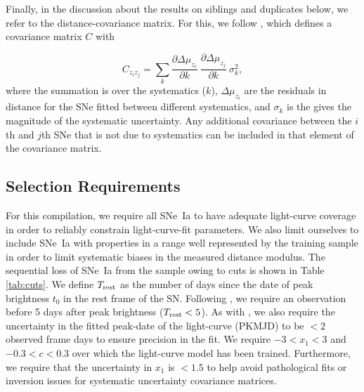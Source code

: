 \documentclass[twocolumn]{aastex63}
\newcommand{\zindex}{z}
\begin{document}
Finally, in the discussion about the results on siblings and duplicates below, we refer to the distance-covariance matrix.  For this, we follow \cite{Conley2010}, which defines a covariance matrix $C$ with

\begin{equation}
C_{z_iz_j} = \sum_{k} \frac{\partial \Delta\mu_{{\zindex}_i}}{\partial k} ~ \frac{\partial \Delta\mu_{{\zindex}_j}}{\partial k} ~ \sigma_k^2,
\label{eq:cov}
\end{equation}
where the summation is over the systematics ($k$), $\Delta\mu_{{\zindex}_i}$ are the residuals in distance for the SNe fitted between different systematics, and $\sigma_k$ is the gives the magnitude of the systematic uncertainty. Any additional covariance between the $i$th and $j$th SNe that is not due to systematics can be included in that element of the covariance matrix.


\subsection{Selection Requirements}
\label{sec:selection}




For this compilation, we require all SNe~Ia to have adequate light-curve coverage in order to reliably constrain light-curve-fit parameters.  We also limit ourselves to include SNe~Ia with properties in a range well represented by the training sample in order to limit systematic biases in the measured distance modulus. The sequential loss of SNe~Ia from the sample owing to cuts is shown in Table \ref{tab:cuts}.  We define $T_{\rm rest}$ as the number of days since the date of peak brightness $t_0$ in the rest frame of the SN. Following \cite{Scolnic2018}, we require an observation before 5 days after peak brightness ($T_{\rm rest}<5$).  As with \cite{Betoule2014}, we also require the uncertainty in the fitted peak-date of the light-curve (PKMJD)  to be $<2$ observed frame days to ensure precision in the fit. We require $-3 < x_1 < 3$ and $-0.3 < c < 0.3$ over which the light-curve model has been trained. Furthermore, we require that the uncertainty in $x_1$ is $<1.5$ to help avoid pathological fits or inversion issues for systematic uncertainty covariance matrices.
\end{document}
